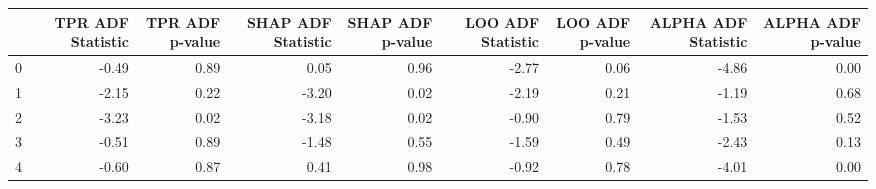 \begin{tabular}{lrrrrrrrr}
\toprule
 & TPR ADF Statistic & TPR ADF p-value & SHAP ADF Statistic & SHAP ADF p-value & LOO ADF Statistic & LOO ADF p-value & ALPHA ADF Statistic & ALPHA ADF p-value \\
\midrule
0 & -0.49 & 0.89 & 0.05 & 0.96 & -2.77 & 0.06 & -4.86 & 0.00 \\
1 & -2.15 & 0.22 & -3.20 & 0.02 & -2.19 & 0.21 & -1.19 & 0.68 \\
2 & -3.23 & 0.02 & -3.18 & 0.02 & -0.90 & 0.79 & -1.53 & 0.52 \\
3 & -0.51 & 0.89 & -1.48 & 0.55 & -1.59 & 0.49 & -2.43 & 0.13 \\
4 & -0.60 & 0.87 & 0.41 & 0.98 & -0.92 & 0.78 & -4.01 & 0.00 \\
\bottomrule
\end{tabular}
